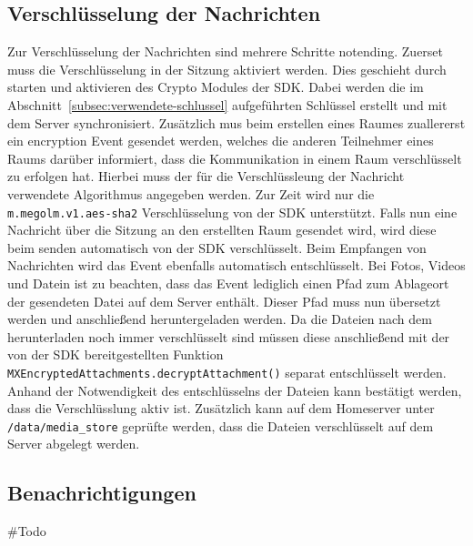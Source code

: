     \subsection{Verschlüsselung der Nachrichten}\label{subsec:verschlusselung-der-nachrichten}
    Zur Verschlüsselung der Nachrichten sind mehrere Schritte notending.
    Zuerset muss die Verschlüsselung in der Sitzung aktiviert werden.
    Dies geschieht durch starten und aktivieren des Crypto Modules der SDK.
    Dabei werden die im Abschnitt~\ref{subsec:verwendete-schlussel} aufgeführten Schlüssel erstellt und mit dem Server synchronisiert.
    Zusätzlich mus beim erstellen eines Raumes zuallererst ein encryption Event gesendet werden, welches die anderen Teilnehmer eines Raums darüber informiert, dass die Kommunikation in einem Raum verschlüsselt zu erfolgen hat.
    Hierbei muss der für die Verschlüssleung der Nachricht verwendete Algorithmus angegeben werden.
    Zur Zeit wird nur die \texttt{m.megolm.v1.aes-sha2} Verschlüsselung von der SDK unterstützt.
    Falls nun eine Nachricht über die Sitzung an den erstellten Raum gesendet wird, wird diese beim senden automatisch von der SDK verschlüsselt.
    Beim Empfangen von Nachrichten wird das Event ebenfalls automatisch entschlüsselt.
    Bei Fotos, Videos und Datein ist zu beachten, dass das Event lediglich einen Pfad zum Ablageort der gesendeten Datei auf dem Server enthält.
    Dieser Pfad muss nun übersetzt werden und anschließend heruntergeladen werden.
    Da die Dateien nach dem herunterladen noch immer verschlüsselt sind müssen diese anschließend mit der von der SDK bereitgestellten Funktion \texttt{MXEncryptedAttachments.decryptAttachment()} separat entschlüsselt werden.
    Anhand der Notwendigkeit des entschlüsselns der Dateien kann bestätigt werden, dass die Verschlüsslung aktiv ist.
    Zusätzlich kann auf dem Homeserver unter \texttt{/data/media\_store} geprüfte werden, dass die Dateien verschlüsselt auf dem Server abgelegt werden.

    \subsection{Benachrichtigungen}\label{subsec:benachrichtigungen}
    \#Todo

    \newpage

